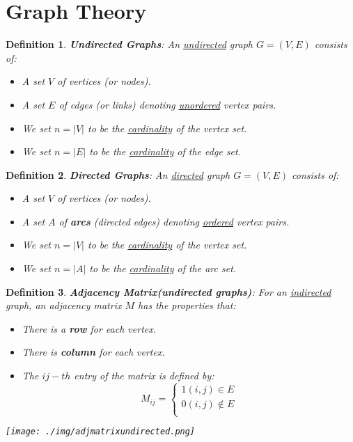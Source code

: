 \documentclass[11pt, a4paper, oneside]{book}
\theoremstyle{theoremdd}
\newtheorem*{definition}{Definition}
\theoremstyle{remark}
\begin{document}
\section*{Graph Theory}
\begin{definition}
\textbf{Undirected Graphs}: An \underline{undirected} graph $G=(V,E)$ consists of:
\begin{itemize}
\item A set $V$ of vertices (or nodes).
\item A set $E$ of edges (or links) denoting \underline{unordered} vertex pairs.
\item We set $n=|V|$ to be the \underline{cardinality} of the vertex set.
\item We set $n=|E|$ to be the \underline{cardinality} of the edge set.
\end{itemize}
\end{definition} 


\begin{definition}
\textbf{Directed Graphs}: An \underline{directed} graph $G=(V,E)$ consists of:
\begin{itemize}
\item A set $V$ of vertices (or nodes).
\item A set $A$ of \textbf{arcs} (directed edges) denoting \underline{ordered} vertex pairs.
\item We set $n=|V|$ to be the \underline{cardinality} of the vertex set.
\item We set $n=|A|$ to be the \underline{cardinality} of the arc set.
\end{itemize}
\end{definition}

\begin{definition}
\textbf{Adjacency Matrix(undirected graphs)}: For an \underline{indirected} graph, an adjacency matrix $M$ has the properties that: 
\begin{itemize}
\item There is a \textbf{row} for each vertex.
\item There is \textbf{column} for each vertex.
\item The $ij-th$ entry of the matrix is defined by: \\
\[
M_{ij} = \begin{cases}
          1 (i,j) \in E \\
          0 (i,j) \notin E \\
         \end{cases}
\]
\end{itemize} 
\begin{center}
\texttt{[image: ./img/adjmatrixundirected.png]}
\end{center}
\end{definition}
\end{document}
